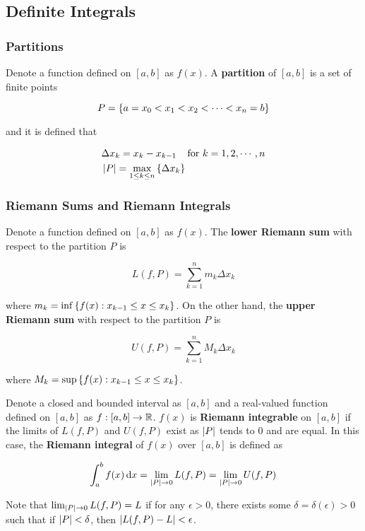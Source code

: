 \documentclass[a4paper,12pt]{article}
\begin{document}
\subsection{Definite Integrals}
\subsubsection{Partitions}
\begin{dft}
  Denote a function defined on $[a,b]$ as $f(x)$. A \textbf{partition} of $[a,b]$ is a set of finite points

  $$P=\left\{ a=x_{0}<x_{1}<x_{2}<\cdots<x_{n}=b\right\}$$

  and it is defined that

  $$\begin{aligned}[t]
    &\Delta x_{k}=x_{k}-x_{k-1}\;\;\;\;\text{for }k=1,2,\cdots,n\\
    &\left| P\right|=\underset{1\leq k\leq n}{\max}\left\{ \Delta x_{k}\right\}
  \end{aligned}$$
\end{dft}

\subsubsection{Riemann Sums and Riemann Integrals}
\begin{dft}
  Denote a function defined on $[a,b]$ as $f(x)$. The \textbf{lower Riemann sum} with respect to the partition $P$ is

  $$L(f,P)=\sum_{k=1}^{n}m_{k}\Delta x_{k}$$\s

  where $m_{k}=\inf\left\{ f(x):x_{k-1}\leq x\leq x_{k}\right\}$. On the other hand, the \textbf{upper Riemann sum} with respect to the partition $P$ is

  $$U(f,P)=\sum_{k=1}^{n}M_{k}\Delta x_{k}$$\s

  where $M_{k}=\sup\left\{ f(x):x_{k-1}\leq x\leq x_{k}\right\}$.\n
\end{dft}

\begin{dft}
  Denote a closed and bounded interval as $[a,b]$ and a real-valued function defined on $[a,b]$ as $f: [a,b]\to\mathbb{R}$. $f(x)$ is \textbf{Riemann integrable} on $[a,b]$ if the limits of $L(f,P)$ and $U(f,P)$ exist as $\left| P\right|$ tends to $0$ and are equal. In this case, the \textbf{Riemann integral} of $f(x)$ over $[a,b]$ is defined as

  $$\int_{a}^{b}f(x)\,\mathrm{d} x=\lim_{\left| P\right|\to 0}L(f,P)=\lim_{\left| P\right|\to 0}U(f,P)$$\s

  Note that $\lim_{\left| P\right|\to 0}L(f,P)=L$ if for any $\epsilon>0$, there exists some $\delta=\delta(\epsilon)>0$ such that if $\left| P\right|<\delta$, then $\left| L(f,P)-L\right|<\epsilon$.
\end{dft}
\end{document}
